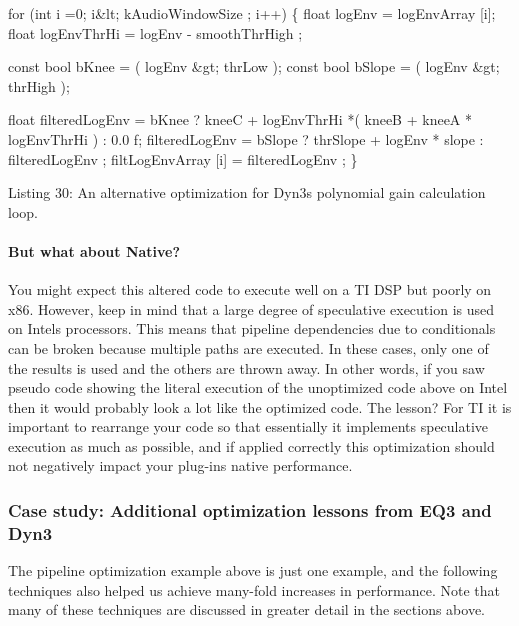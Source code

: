 \begin{DoxyCode}
\textcolor{keywordflow}{for} (\textcolor{keywordtype}{int} i =0; i&lt; kAudioWindowSize ; i++)
\{
    \textcolor{keywordtype}{float} logEnv = logEnvArray [i];
    \textcolor{keywordtype}{float} logEnvThrHi = logEnv - smoothThrHigh ;

    \textcolor{keyword}{const} \textcolor{keywordtype}{bool} bKnee = ( logEnv &gt; thrLow );
    \textcolor{keyword}{const} \textcolor{keywordtype}{bool} bSlope = ( logEnv &gt; thrHigh );

    \textcolor{keywordtype}{float} filteredLogEnv = bKnee ?
        kneeC + logEnvThrHi *( kneeB + kneeA * logEnvThrHi ) :
        0.0 f;
    filteredLogEnv = bSlope ?
        thrSlope + logEnv * slope :
        filteredLogEnv ;
    filtLogEnvArray [i] = filteredLogEnv ;
\} 
\end{DoxyCode}
  Listing 30\+: An alternative optimization for Dyn3\textquotesingle{}s polynomial gain calculation loop.

\hypertarget{a00362_subsubsection__but_what_about_native__}{}\paragraph{But what about Native?}\label{a00362_subsubsection__but_what_about_native__}
 You might expect this altered code to execute well on a T\+I D\+S\+P but poorly on x86. However, keep in mind that a large degree of speculative execution is used on Intel\textquotesingle{}s processors. This means that pipeline dependencies due to conditionals can be broken because multiple paths are executed. In these cases, only one of the results is used and the others are thrown away. In other words, if you saw pseudo code showing the literal execution of the unoptimized code above on Intel then it would probably look a lot like the optimized code. The lesson? For T\+I it is important to rearrange your code so that essentially it implements speculative execution as much as possible, and if applied correctly this optimization should not negatively impact your plug-\/in\textquotesingle{}s native performance.

\hypertarget{a00362_subsection__case_study_additional_optimization_lessons_from_eq3_and_dyn3}{}\subsubsection{Case study\+: Additional optimization lessons from E\+Q3 and Dyn3}\label{a00362_subsection__case_study_additional_optimization_lessons_from_eq3_and_dyn3}
 The pipeline optimization example above is just one example, and the following techniques also helped us achieve many-\/fold increases in performance. Note that many of these techniques are discussed in greater detail in the sections above.

